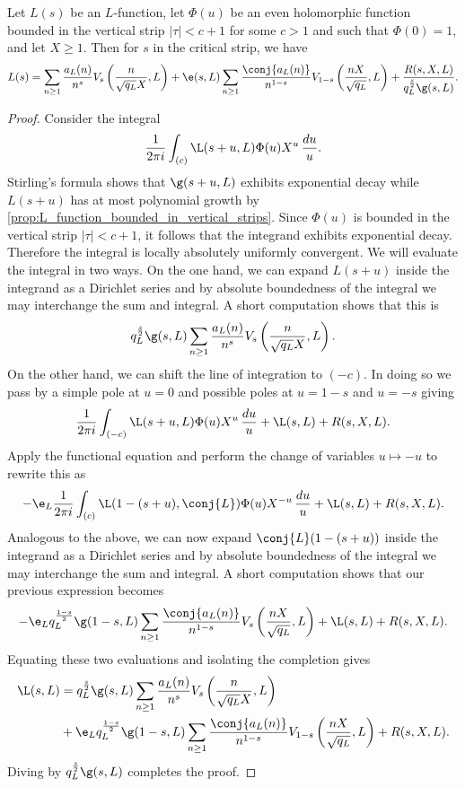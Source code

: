 \documentclass[12pt]{article}
\begin{document}
      \begin{theorem*}
        Let \(L(s)\) be an \(L\)-function, let \(\Phi(u)\) be an even holomorphic function bounded in the vertical strip \(|\tau| < c+1\) for some \(c > 1\) and such that \(\Phi(0) = 1\), and let \(X \ge 1\). Then for \(s\) in the critical strip, we have
        \[
          L(s) = \sum_{n \ge 1}\frac{a_{L}(n)}{n^{s}}V_{s}\left(\frac{n}{\sqrt{q_{L}}X},L\right)+\e(s,L)\sum_{n \ge 1}\frac{\conj{a_{L}(n)}}{n^{1-s}}V_{1-s}\left(\frac{nX}{\sqrt{q_{L}}},L\right)+\frac{R(s,X,L)}{q_{L}^{\frac{s}{2}}\g(s,L)}.
        \]
      \end{theorem*}
      \begin{proof}
        Consider the integral
        \[
          \frac{1}{2\pi i}\int_{(c)}\L(s+u,L)\Phi(u)X^{u}\,\frac{du}{u}.
        \]    
        Stirling's formula shows that \(\g(s+u,L)\) exhibits exponential decay while \(L(s+u)\) has at most polynomial growth by \cref{prop:L_function_bounded_in_vertical_strips}. Since \(\Phi(u)\) is bounded in the vertical strip \(|\tau| < c+1\), it follows that the integrand exhibits exponential decay. Therefore the integral is locally absolutely uniformly convergent. We will evaluate the integral in two ways. On the one hand, we can expand \(L(s+u)\) inside the integrand as a Dirichlet series and by absolute boundedness of the integral we may interchange the sum and integral. A short computation shows that this is
        \[
          q_{L}^{\frac{s}{2}}\g(s,L)\sum_{n \ge 1}\frac{a_{L}(n)}{n^{s}}V_{s}\left(\frac{n}{\sqrt{q_{L}}X},L\right).
        \]
        On the other hand, we can shift the line of integration to \((-c)\). In doing so we pass by a simple pole at \(u = 0\) and possible poles at \(u = 1-s\) and \(u = -s\) giving
        \[
          \frac{1}{2\pi i}\int_{(-c)}\L(s+u,L)\Phi(u)X^{u}\,\frac{du}{u}+\L(s,L)+R(s,X,L).
        \]
        Apply the functional equation and perform the change of variables \(u \mapsto -u\) to rewrite this as
        \[
          -\e_{L}\frac{1}{2\pi i}\int_{(c)}\L(1-(s+u),\conj{L})\Phi(u)X^{-u}\,\frac{du}{u}+\L(s,L)+R(s,X,L).
        \]
        Analogous to the above, we can now expand \(\conj{L}(1-(s+u))\) inside the integrand as a Dirichlet series and by absolute boundedness of the integral we may interchange the sum and integral. A short computation shows that our previous expression becomes
        \[
          -\e_{L}q_{L}^{\frac{1-s}{2}}\g(1-s,L)\sum_{n \ge 1}\frac{\conj{a_{L}(n)}}{n^{1-s}}V_{s}\left(\frac{nX}{\sqrt{q_{L}}},L\right)+\L(s,L)+R(s,X,L).
        \]
        Equating these two evaluations and isolating the completion gives
        \begin{align*}
          \L(s,L) &= q_{L}^{\frac{s}{2}}\g(s,L)\sum_{n \ge 1}\frac{a_{L}(n)}{n^{s}}V_{s}\left(\frac{n}{\sqrt{q_{L}}X},L\right) \\
          &+ \e_{L}q_{L}^{\frac{1-s}{2}}\g(1-s,L)\sum_{n \ge 1}\frac{\conj{a_{L}(n)}}{n^{1-s}}V_{1-s}\left(\frac{nX}{\sqrt{q_{L}}},L\right)+R(s,X,L).
        \end{align*}
        Diving by \(q_{L}^{\frac{s}{2}}\g(s,L)\) completes the proof.
      \end{proof}
\end{document}
